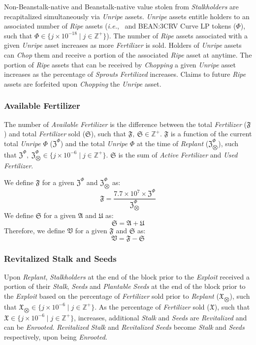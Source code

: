 \documentclass[tikz]{article}
\newcommand{\term}[1]{\textsl{#1}}
\newcommand{\Bean}{} %
\begin{document}
Non-Beanstalk-native and Beanstalk-native value stolen from \term{Stalkholders} are recapitalized simultaneously via \term{Unripe} assets. \term{Unripe} assets entitle holders to an associated number of \term{Ripe} assets (\term{i.e.}, \Bean\ and BEAN:3CRV Curve LP tokens ($\Phi$), such that $\Phi \in \{j \times 10^{-18} \mid j \in \mathbb{Z}^{+} \}$). The number of \term{Ripe} assets associated with a given \term{Unripe} asset increases as more \term{Fertilizer} is sold. Holders of \term{Unripe} assets can \term{Chop} them and receive a portion of the associated \term{Ripe} asset at anytime. The portion of \term{Ripe} assets that can be received by \term{Chopping} a given \term{Unripe} asset increases as the percentage of \term{Sprouts} \term{Fertilized} increases. Claims to future \term{Ripe} assets are forfeited upon \term{Chopping} the \term{Unripe} asset. 

\subsubsection{Available Fertilizer}
The number of \term{Available} \term{Fertilizer} is the difference between the total \term{Fertilizer} ($\mathfrak{F}$) and total \term{Fertilizer} sold ($\mathfrak{S}$), such that $\mathfrak{F},\ \mathfrak{S} \in \mathbb{Z}^{+}$. $\mathfrak{F}$ is a function of the current total \term{Unripe} $\Phi$ ($\mathfrak{Z}^{\Phi}$) and the total \term{Unripe} $\Phi$ at the time of \term{Replant} ($\mathfrak{Z}_{\bigotimes}^{\Phi}$), such that $\mathfrak{Z}^{\Phi},\ \mathfrak{Z}_{\bigotimes}^{\Phi} \in \{j \times 10^{-6} \mid j \in \mathbb{Z}^{+} \}$. $\mathfrak{S}$ is the sum of \term{Active} \term{Fertilizer} and \term{Used} \term{Fertilizer}.

We define $\mathfrak{F}$ for a given $\mathfrak{Z}^{\Phi}$ and $\mathfrak{Z}_{\bigotimes}^{\Phi}$ as:
$$\mathfrak{F} = \frac{7.7 \times 10^{7} \times \mathfrak{Z}^{\Phi}}{\mathfrak{Z}_{\bigotimes}^{\Phi}}$$
We define $\mathfrak{S}$ for a given $\mathfrak{A}$ and $\mathfrak{U}$ as: 
$$\mathfrak{S} = \mathfrak{A} + \mathfrak{U}$$
Therefore, we define $\mathfrak{V}$ for a given $\mathfrak{F}$ and $\mathfrak{S}$ as:
$$\mathfrak{V} = \mathfrak{F} - \mathfrak{S}$$

\subsubsection{Revitalized Stalk and Seeds}
Upon \term{Replant}, \term{Stalkholders} at the end of the block prior to the \term{Exploit} received a portion of their \term{Stalk}, \term{Seeds} and \term{Plantable} \term{Seeds} at the end of the block prior to the \term{Exploit} based on the percentage of \term{Fertilizer} sold prior to \term{Replant} ($\mathfrak{X}_{\bigotimes}$), such that $\mathfrak{X}_{\bigotimes} \in \{j \times 10^{-6} \mid j \in \mathbb{Z}^{+} \}$. As the percentage of \term{Fertilizer} sold ($\mathfrak{X}$), such that $\mathfrak{X} \in \{j \times 10^{-6} \mid j \in \mathbb{Z}^{+} \}$, increases, additional \term{Stalk} and \term{Seeds} are \term{Revitalized} and can be \term{Enrooted}. \term{Revitalized} \term{Stalk} and \term{Revitalized} \term{Seeds} become \term{Stalk} and \term{Seeds} respectively, upon being \term{Enrooted}. 
\end{document}
